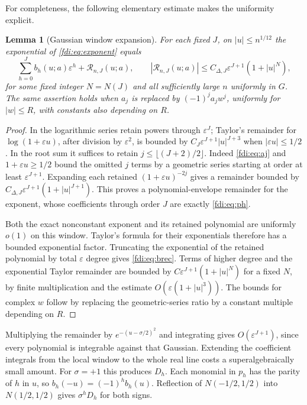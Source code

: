 \documentclass[11pt,letterpaper]{article}
\newtheorem{lemma}[theorem]{Lemma}
\theoremstyle{remark}\newtheorem{remark}[theorem]{Remark}
\newcommand{\eps}{\varepsilon}\newcommand{\Pois}{\operatorname{Poisson}}
\begin{document}
For completeness, the following elementary estimate makes the uniformity explicit.
\begin{lemma}[Gaussian window expansion]\label{fdi:lem:window}
For each fixed $J$, on $|u|\le n^{1/12}$ the exponential of \eqref{fdi:eq:exponent} equals
\[
 \sum_{h=0}^J b_h(u;a)\eps^h+\mathcal R_{n,J}(u;a),
 \qquad
 |\mathcal R_{n,J}(u;a)|\le C_{\Delta,J}\eps^{J+1}(1+|u|^N),
\]
for some fixed integer $N=N(J)$ and all sufficiently large $n$ uniformly in $G$. The same assertion holds when $a_j$ is replaced by $(-1)^ja_jw^j$, uniformly for $|w|\le R$, with constants also depending on $R$.
\end{lemma}
\begin{proof}
In the logarithmic series retain powers through $\eps^J$; Taylor's remainder for $\log(1+\eps u)$, after division by $\eps^2$, is bounded by $C_J\eps^{J+1}|u|^{J+3}$ when $|\eps u|\le1/2$. In the root sum it suffices to retain $j\le\lfloor(J+2)/2\rfloor$. Indeed \eqref{fdi:eq:aj} and $1+\eps u\ge1/2$ bound the omitted $j$ terms by a geometric series starting at order at least $\eps^{J+1}$. Expanding each retained $(1+\eps u)^{-2j}$ gives a remainder bounded by $C_{\Delta,J}\eps^{J+1}(1+|u|^{J+1})$. This proves a polynomial-envelope remainder for the exponent, whose coefficients through order $J$ are exactly \eqref{fdi:eq:ph}.

Both the exact nonconstant exponent and its retained polynomial are uniformly $o(1)$ on this window. Taylor's formula for their exponentials therefore has a bounded exponential factor. Truncating the exponential of the retained polynomial by total $\eps$ degree gives \eqref{fdi:eq:brec}. Terms of higher degree and the exponential Taylor remainder are bounded by $C\eps^{J+1}(1+|u|^N)$ for a fixed $N$, by finite multiplication and the estimate $O(\eps(1+|u|^3))$. The bounds for complex $w$ follow by replacing the geometric-series ratio by a constant multiple depending on $R$.
\end{proof}
Multiplying the remainder by $e^{-(u-\sigma/2)^2}$ and integrating gives $O(\eps^{J+1})$, since every polynomial is integrable against that Gaussian. Extending the coefficient integrals from the local window to the whole real line costs a superalgebraically small amount. For $\sigma=+1$ this produces $D_h$. Each monomial in $p_h$ has the parity of $h$ in $u$, so $b_h(-u)=(-1)^hb_h(u)$. Reflection of $N(-1/2,1/2)$ into $N(1/2,1/2)$ gives $\sigma^hD_h$ for both signs.
\end{document}
